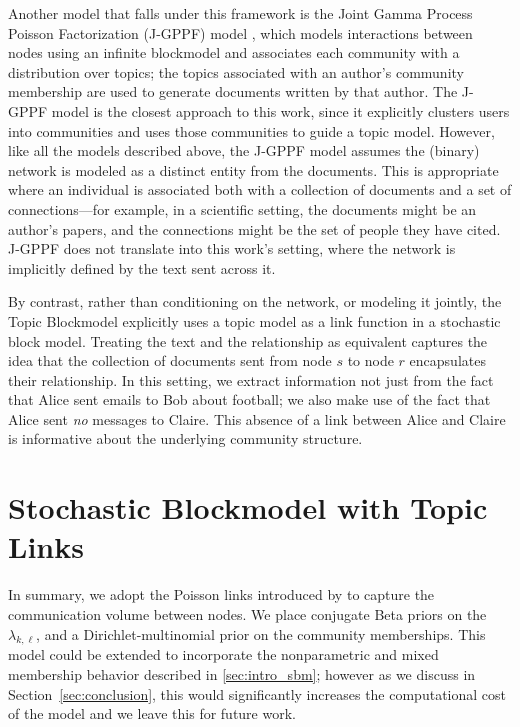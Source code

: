         Another model that falls under this framework is the Joint Gamma Process Poisson Factorization (J-GPPF) model \citep{acharya2015}, which models interactions between nodes using an infinite blockmodel and associates each community with a distribution over topics; the topics associated with an author's community membership are used to generate documents written by that author. The J-GPPF model is the closest approach to this work, since it explicitly clusters users into communities and uses those communities to guide a topic model. However, like all the models described above, the J-GPPF model assumes the (binary) network is modeled as a distinct entity from the documents. This is appropriate where an individual is associated both with a collection of documents and a set of connections---for example, in a scientific setting, the documents might be an author's papers, and the connections might be the set of people they have cited. J-GPPF does not translate into this work's setting, where the network is implicitly defined by the text sent across it.
    
        By contrast, rather than conditioning on the network, or modeling it jointly, the Topic Blockmodel explicitly uses a topic model as a link function in a stochastic block model.  Treating the text and the relationship as equivalent captures the idea that the collection of documents sent from node $s$ to node $r$ encapsulates their relationship. In this setting, we extract information not just from the fact that Alice sent emails to Bob about football; we also make use of the fact that Alice sent \textit{no} messages to Claire. This absence of a link between Alice and Claire is informative about the underlying community structure.

\section{Stochastic Blockmodel with Topic Links}\label{sec:model}
    
    In summary, we adopt the Poisson links introduced by \citep{Karrer:Newman:2011} to capture the communication volume between nodes.  We place conjugate Beta priors on the $\lambda_{k,\ell}$, and a Dirichlet-multinomial prior on the community memberships. This model could be extended to incorporate the nonparametric and mixed membership behavior described in \ref{sec:intro_sbm}; however as we discuss in Section~\ref{sec:conclusion}, this would significantly increases the computational cost of the model and we leave this for future work. 
    
